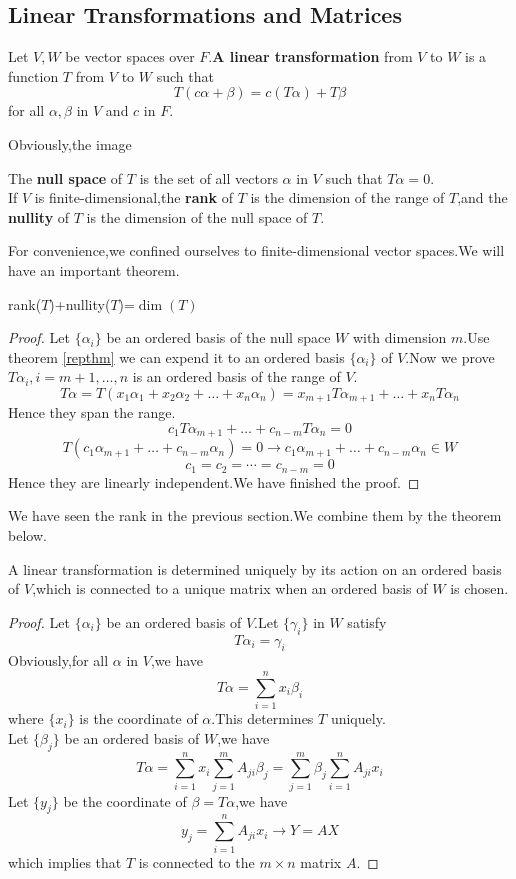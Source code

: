\documentclass{article}
\begin{document}
\subsection{Linear Transformations and Matrices}
\begin{dde}
	Let $V,W$ be vector spaces over $F$.\textbf{A linear transformation} from $V$ to $W$ is a function $T$ from $V$ to $W$ such that
	\[T(c\alpha+\beta)=c(T\alpha)+T\beta\]
	for all $\alpha,\beta$ in $V$ and $c$ in $F$.
\end{dde}
Obviously,the image 
\begin{dde}
	The \textbf{null space} of $T$ is the set of all vectors $\alpha$ in $V$ such that $T\alpha=0$.\\
	If $V$ is finite-dimensional,the \textbf{rank} of $T$ is the dimension of the range of $T$,and the \textbf{nullity} of $T$ is the dimension of the null space of $T$.
\end{dde}
For convenience,we confined ourselves to finite-dimensional vector spaces.We will have an important theorem.
\begin{thm}\label{dimthm}
	rank($T$)+nullity($T$)=$\dim(T)$
\end{thm}
\begin{proof}
	Let $\{\alpha_i\}$ be an ordered basis of the null space $W$ with dimension $m$.Use theorem \ref{repthm} we can expend it to an ordered basis $\{\alpha_{i}\}$ of $V$.Now we prove $T\alpha_i,i=m+1,\dots,n$ is an ordered basis of the range of $V$.
	\[T\alpha=T(x_1\alpha_1+x_2\alpha_2+\dots+x_n\alpha_n)=x_{m+1}T\alpha_{m+1}+\dots+x_nT\alpha_n\]
	Hence they span the range.
	\[c_1T\alpha_{m+1}+\dots+c_{n-m}T\alpha_n=0\]
	\[T(c_1\alpha_{m+1}+\dots+c_{n-m}\alpha_n)=0\rightarrow c_1\alpha_{m+1}+\dots+c_{n-m}\alpha_n\in W\]
	\[c_1=c_2=\cdots=c_{n-m}=0\]
	Hence they are linearly independent.We have finished the proof.
\end{proof}
We have seen the rank in the previous section.We combine them by the theorem below. 
\begin{thm}\label{matrixrepthm}
	A linear transformation is determined uniquely by its action on an ordered basis of $V$,which is connected to a unique matrix when an ordered basis of $W$ is chosen.
\end{thm}
\begin{proof}
	Let $\{\alpha_i\}$ be an ordered basis of $V$.Let $\{\gamma_i\}$ in $W$ satisfy
	\[T\alpha_i=\gamma_i\]
	Obviously,for all $\alpha$ in $V$,we have
	\[T\alpha=\sum\limits_{i=1}^nx_i\beta_i\]
	where $\{x_i\}$ is the coordinate of $\alpha$.This determines $T$ uniquely.\\
	Let $\{\beta_j\}$ be an ordered basis of $W$,we have
	\[T\alpha=\sum\limits_{i=1}^nx_i\sum\limits_{j=1}^mA_{ji}\beta_j=\sum\limits_{j=1}^m\beta_j\sum\limits_{i=1}^nA_{ji}x_i\]
	Let $\{y_j\}$ be the coordinate of $\beta=T\alpha$,we have
	\[y_j=\sum\limits_{i=1}^nA_{ji}x_i\rightarrow Y=AX\]
	which implies that $T$ is connected to the $m\times n$ matrix $A$.
\end{proof}
\end{document}
